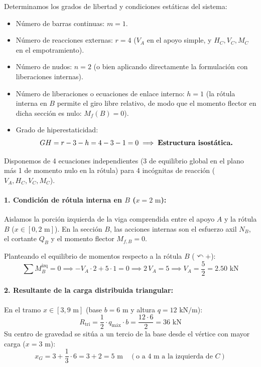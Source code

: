 
Determinamos los grados de libertad y condiciones estáticas del sistema:
\begin{itemize}
    \item Número de barras continuas: $m = 1$.
    \item Número de reacciones externas: $r = 4$ ($V_A$ en el apoyo simple, y $H_C, V_C, M_C$ en el empotramiento).
    \item Número de nudos: $n = 2$ (o bien aplicando directamente la formulación con liberaciones internas).
    \item Número de liberaciones o ecuaciones de enlace interno: $h = 1$ (la rótula interna en $B$ permite el giro libre relativo, de modo que el momento flector en dicha sección es nulo: $M_f(B) = 0$).
    \item Grado de hiperestaticidad:
    \[
        GH = r - 3 - h = 4 - 3 - 1 = 0 \implies \text{\textbf{Estructura isostática.}}
    \]
\end{itemize}
Disponemos de 4 ecuaciones independientes (3 de equilibrio global en el plano más 1 de momento nulo en la rótula) para 4 incógnitas de reacción ($V_A, H_C, V_C, M_C$).


\paragraph{1. Condición de rótula interna en $B$ ($x = 2\text{ m}$):}
Aislamos la porción izquierda de la viga comprendida entre el apoyo $A$ y la rótula $B$ ($x \in [0, 2\text{ m}]$). En la sección $B$, las acciones internas son el esfuerzo axil $N_B$, el cortante $Q_B$ y el momento flector $M_{f,B} = 0$.

Planteando el equilibrio de momentos respecto a la rótula $B$ ($\curvearrowleft +$):
\begin{equation}
    \sum M_B^{\text{izq}} = 0 \implies -V_A \cdot 2 + 5 \cdot 1 = 0 \implies 2\,V_A = 5 \implies \boxed{V_A = \frac{5}{2} = 2.50\text{ kN}}
\end{equation}

\paragraph{2. Resultante de la carga distribuida triangular:}
En el tramo $x \in [3, 9\text{ m}]$ (base $b = 6\text{ m}$ y altura $q = 12\text{ kN/m}$):
\[
    R_{\text{tri}} = \frac{1}{2} \cdot q_{\text{máx}} \cdot b = \frac{12 \cdot 6}{2} = 36\text{ kN}
\]
Su centro de gravedad se sitúa a un tercio de la base desde el vértice con mayor carga ($x = 3\text{ m}$):
\[
    x_G = 3 + \frac{1}{3} \cdot 6 = 3 + 2 = 5\text{ m} \quad (\text{o a } 4\text{ m a la izquierda de } C)
\]

